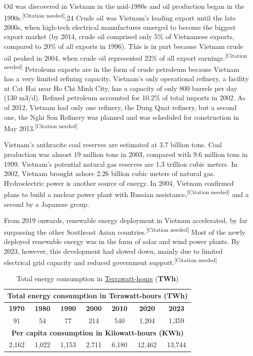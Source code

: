 \documentclass{article}
\begin{document}
Oil was discovered in Vietnam in the mid-1980s and oil production began in the 1990s.\textsuperscript{[Citation needed]}:24 Crude oil was Vietnam's leading export until the late 2000s, when high-tech electrical manufactures emerged to become the biggest export market (by 2014, crude oil comprised only 5\% of Vietnamese exports, compared to 20\% of all exports in 1996). This is in part because Vietnam crude oil peaked in 2004, when crude oil represented 22\% of all export earnings.\textsuperscript{[Citation needed]} Petroleum exports are in the form of crude petroleum because Vietnam has a very limited refining capacity. Vietnam's only operational refinery, a facility at Cat Hai near Ho Chi Minh City, has a capacity of only 800 barrels per day (130 m3/d). Refined petroleum accounted for 10.2\% of total imports in 2002. As of 2012, Vietnam had only one refinery, the Dung Quat refinery, but a second one, the Nghi Son Refinery was planned and was scheduled for construction in May 2013.\textsuperscript{[Citation needed]}

Vietnam's anthracite coal reserves are estimated at 3.7 billion tons. Coal production was almost 19 million tons in 2003, compared with 9.6 million tons in 1999. Vietnam's potential natural gas reserves are 1.3 trillion cubic meters. In 2002, Vietnam brought ashore 2.26 billion cubic meters of natural gas. Hydroelectric power is another source of energy. In 2004, Vietnam confirmed plans to build a nuclear power plant with Russian assistance,\textsuperscript{[Citation needed]} and a second by a Japanese group.

From 2019 onwards, renewable energy deployment in Vietnam accelerated, by far surpassing the other Southeast Asian countries.\textsuperscript{[Citation needed]} Most of the newly deployed renewable energy was in the form of solar and wind power plants. By 2023, however, this development had slowed down, mainly due to limited electrical grid capacity and reduced government support.\textsuperscript{[Citation needed]}
\begin{table}[h!]
    \centering
    \caption*{Total energy consumption in \href{https://en.wikipedia.org/wiki/Terrawatt-hour}{Terrawatt-hours} (\textbf{TWh})}
    \label{tab:energy_consumption}
    \begin{tabular}{|c|c|c|c|c|c|c|}
    \hline
    \multicolumn{7}{|c|}{\textbf{Total energy consumption in Terawatt-hours (TWh)}} \\
    \hline
    \textbf{1970} & \textbf{1980} & \textbf{1990} & \textbf{2000} & \textbf{2010} & \textbf{2020} & \textbf{2023} \\
    \hline
    91 & 54 & 77 & 214 & 540 & 1,204 & 1,359 \\
    \hline
    \multicolumn{7}{|c|}{\textbf{Per capita consumption in Kilowatt-hours (KWh)}} \\
    \hline
    2,162 & 1,022 & 1,153 & 2,711 & 6,180 & 12,462 & 13,744 \\
    \hline
    \end{tabular}
\end{table}
\end{document}
